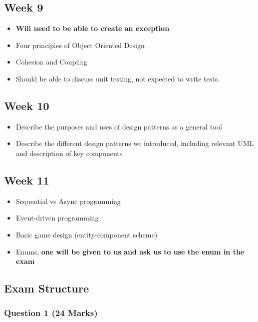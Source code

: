 \documentclass[]{article}
\providecommand{\tightlist}{%
  \setlength{\itemsep}{0pt}\setlength{\parskip}{0pt}}
\begin{document}
\hypertarget{week-9}{%
\subsection{Week 9}\label{week-9}}

\begin{itemize}
\tightlist
\item
  \textbf{Will need to be able to create an exception}
\item
  Four principles of Object Oriented Design
\item
  Cohesion and Coupling
\item
  Should be able to discuss unit testing, not expected to write tests.
\end{itemize}

\hypertarget{week-10}{%
\subsection{Week 10}\label{week-10}}

\begin{itemize}
\tightlist
\item
  Describe the purposes and uses of design patterns as a general tool
\item
  Describe the different design patterns we introduced, including
  relevant UML and description of key components
\end{itemize}

\hypertarget{week-11}{%
\subsection{Week 11}\label{week-11}}

\begin{itemize}
\tightlist
\item
  Sequential vs Async programming
\item
  Event-driven programming
\item
  Basic game design (entity-component scheme)
\item
  Enums, \textbf{one will be given to us and ask us to use the enum in
  the exam}
\end{itemize}

\hypertarget{exam-structure}{%
\subsection{Exam Structure}\label{exam-structure}}

\hypertarget{question-1-24-marks}{%
\subsubsection{Question 1 (24 Marks)}\label{question-1-24-marks}}
\end{document}
